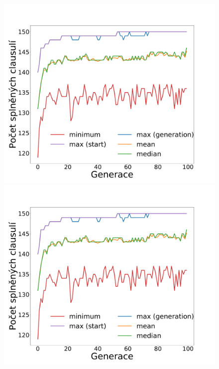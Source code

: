 \documentclass[11pt]{article}
\begin{document}
\begin{figure}
	\centering
    \begin{minipage}[c]{0.325\textwidth}
        \centering\includegraphics[width=\textwidth]{img/1c.pdf} 
    \end{minipage}
    \begin{minipage}[c]{0.325\textwidth}
        \centering \includegraphics[width=\textwidth]{img/1c.pdf} 
    \end{minipage}
    \begin{minipage}[c]{0.325\textwidth}

\end{minipage}
\end{figure}
\end{document}
